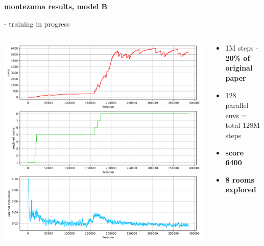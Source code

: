 \documentclass[xcolor=dvipsnames]{beamer}
\begin{document}
\begin{frame}{\bf montezuma results, model B}

- training in progress

\begin{columns}

    \begin{column}{0.5\textwidth}
      \includegraphics[scale=0.25]{../results/ppo_rnd_b_0.png}
    \end{column}

    \begin{column}{0.5\textwidth}
      \begin{itemize}
        \item 1M  steps - {\bf 20\% of original paper}
        \item 128 parallel envs = total 128M steps
        \item {\bf score 6400}
        \item {\bf 8 rooms explored}
      \end{itemize}
    \end{column}


\end{columns}


\end{frame}
\end{document}
